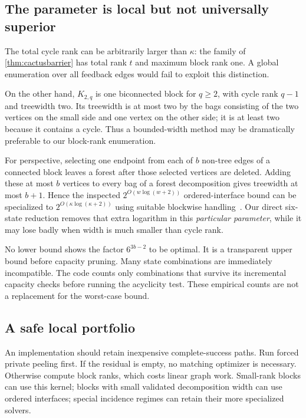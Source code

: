\documentclass[11pt,letterpaper]{article}
\theoremstyle{definition}
\theoremstyle{remark}
\begin{document}
\subsection{The parameter is local but not universally superior}
The total cycle rank can be arbitrarily larger than $\kappa$: the family of \cref{thm:cactusbarrier} has total rank $t$ and maximum block rank one. A global enumeration over all feedback edges would fail to exploit this distinction.

On the other hand, $K_{2,q}$ is one biconnected block for $q\ge2$, with cycle rank $q-1$ and treewidth two. Its treewidth is at most two by the bags consisting of the two vertices on the small side and one vertex on the other side; it is at least two because it contains a cycle. Thus a bounded-width method may be dramatically preferable to our block-rank enumeration.

For perspective, selecting one endpoint from each of $b$ non-tree edges of a connected block leaves a forest after those selected vertices are deleted. Adding these at most $b$ vertices to every bag of a forest decomposition gives treewidth at most $b+1$. Hence the inspected $2^{O(w\log(w+2))}$ ordered-interface bound can be specialized to $2^{O(\kappa\log(\kappa+2))}$ using suitable blockwise handling~\cite{prove109,prove110}. Our direct six-state reduction removes that extra logarithm in this \emph{particular parameter}, while it may lose badly when width is much smaller than cycle rank.

No lower bound shows the factor $6^{3b-2}$ to be optimal. It is a transparent upper bound before capacity pruning. Many state combinations are immediately incompatible. The code counts only combinations that survive its incremental capacity checks before running the acyclicity test. These empirical counts are not a replacement for the worst-case bound.

\subsection{A safe local portfolio}
An implementation should retain inexpensive complete-success paths. Run forced private peeling first. If the residual is empty, no matching optimizer is necessary. Otherwise compute block ranks, which costs linear graph work. Small-rank blocks can use this kernel; blocks with small validated decomposition width can use ordered interfaces; special incidence regimes can retain their more specialized solvers.
\end{document}
